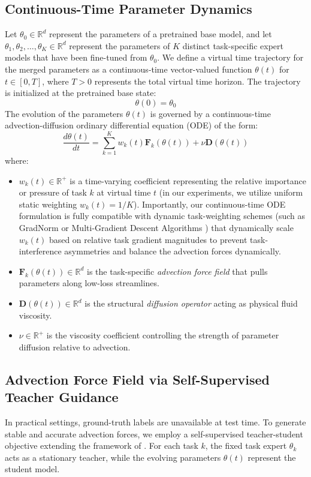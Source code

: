 \subsection{Continuous-Time Parameter Dynamics}
Let $\theta_0 \in \mathbb{R}^d$ represent the parameters of a pretrained base model, and let $\theta_1, \theta_2, \dots, \theta_K \in \mathbb{R}^d$ represent the parameters of $K$ distinct task-specific expert models that have been fine-tuned from $\theta_0$. We define a virtual time trajectory for the merged parameters as a continuous-time vector-valued function $\theta(t)$ for $t \in [0, T]$, where $T > 0$ represents the total virtual time horizon. The trajectory is initialized at the pretrained base state:
\begin{equation}
    \theta(0) = \theta_0
\end{equation}
The evolution of the parameters $\theta(t)$ is governed by a continuous-time advection-diffusion ordinary differential equation (ODE) of the form:
\begin{equation}
    \frac{d\theta(t)}{dt} = \sum_{k=1}^K w_k(t) \mathbf{F}_k(\theta(t)) + \nu \mathbf{D}(\theta(t))
\end{equation}
where:
\begin{itemize}
    \item $w_k(t) \in \mathbb{R}^+$ is a time-varying coefficient representing the relative importance or pressure of task $k$ at virtual time $t$ (in our experiments, we utilize uniform static weighting $w_k(t) = 1/K$). Importantly, our continuous-time ODE formulation is fully compatible with dynamic task-weighting schemes (such as GradNorm \cite{chen2018gradnorm} or Multi-Gradient Descent Algorithms \cite{sener2018multi}) that dynamically scale $w_k(t)$ based on relative task gradient magnitudes to prevent task-interference asymmetries and balance the advection forces dynamically.
    \item $\mathbf{F}_k(\theta(t)) \in \mathbb{R}^d$ is the task-specific \emph{advection force field} that pulls parameters along low-loss streamlines.
    \item $\mathbf{D}(\theta(t)) \in \mathbb{R}^d$ is the structural \emph{diffusion operator} acting as physical fluid viscosity.
    \item $\nu \in \mathbb{R}^+$ is the viscosity coefficient controlling the strength of parameter diffusion relative to advection.
\end{itemize}

\subsection{Advection Force Field via Self-Supervised Teacher Guidance}
In practical settings, ground-truth labels are unavailable at test time. To generate stable and accurate advection forces, we employ a self-supervised teacher-student objective extending the framework of \citet{jung2025symerge}. For each task $k$, the fixed task expert $\theta_k$ acts as a stationary teacher, while the evolving parameters $\theta(t)$ represent the student model.

